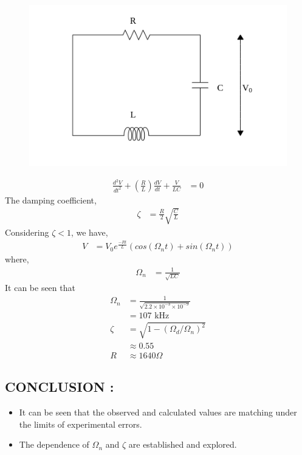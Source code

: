 \documentclass[12pt]{article}
\begin{document}
\begin{figure}[!ht]
	\includegraphics[width=\columnwidth]{circuit.png}
\end{figure}
\begin{align}
	\frac{d^2V}{dt^2} + \left(\frac{R}{L}\right) \frac{dV}{dt} + \frac{V}{LC} &= 0 \label{eq:de}
\end{align}
The damping coefficient, 
\begin{align}
	\zeta &= \frac{R}{2} \sqrt{\frac{C}{L}}
\end{align}
Considering $\zeta < 1$, we have, 
\begin{align}
	V &= V_{0} e^{\frac{-Rt}{L}} \left(cos(\Omega_{n} t ) + sin(\Omega_{n} t ) \right)
\end{align}
where, 
\begin{align}
	\Omega_{n} &= \frac{1}{\sqrt{LC}}
\end{align}
It can be seen that 
\begin{align}
	\Omega_{n} &= \frac{1}{\sqrt{2.2 \times 10^{-3} \times 10^{-9} }} \\
	&= 107 \text{ kHz} \\
	\zeta &= \sqrt{1 - (\Omega_{d}/\Omega_{n})^2} \\
	&\approx 0.55 \\
	R &\approx 1640 \Omega
\end{align}

\subsection{\textbf{CONCLUSION : }}
\begin{itemize}
\item It can be seen that the observed and calculated values are matching under the limits of experimental errors.
\item The dependence of $\Omega_{n}$ and $\zeta$ are established and explored. 
\end{itemize}
\end{document}
